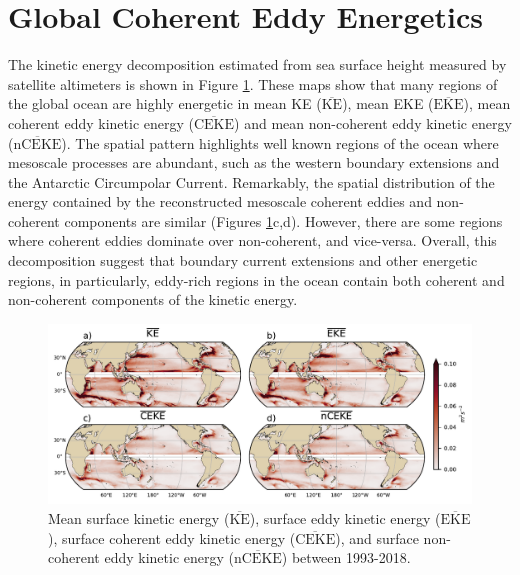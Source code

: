 \documentclass[draft,linenumbers]{agujournal2019}
\newcommand{\MKE}{\overline{\textrm{KE}}}
\newcommand{\MEKE}{\overline{\textrm{EKE}}}
\newcommand{\MCEKE}{\overline{\textrm{CEKE}}}
\newcommand{\MnCEKE}{\overline{\textrm{nCEKE}}}
\begin{document}
	\section{Global Coherent Eddy Energetics}
	\label{sec:CEKE_climatology}


	The kinetic energy decomposition estimated from sea surface height measured by satellite altimeters is shown in Figure \ref{fig:eddy_climatology}. 
	These maps show that many regions of the global ocean are highly energetic in mean KE ($\MKE$), mean EKE ($\MEKE$), mean coherent eddy kinetic energy ($\MCEKE$) and mean non-coherent eddy kinetic energy ($\MnCEKE$). 
	The spatial pattern highlights well known regions of the ocean where mesoscale processes are abundant, such as the western boundary extensions and the Antarctic Circumpolar Current. 
	Remarkably, the spatial distribution of the energy contained by the reconstructed mesoscale coherent eddies and non-coherent components are similar (Figures \ref{fig:eddy_climatology}c,d). 
	However, there are some regions where coherent eddies dominate over non-coherent, and vice-versa. 
	Overall, this decomposition suggest that boundary current extensions and other energetic regions, in particularly, eddy-rich regions in the ocean contain both coherent and non-coherent components of the kinetic energy.

	\begin{figure}[t]
	    \centering
	    \includegraphics[width=1\textwidth]{figures/mean_ke_maps_satellite.pdf}
	    \caption{Mean surface kinetic energy ($\MKE$), surface eddy kinetic energy ($\MEKE$), surface coherent eddy kinetic energy ($\MCEKE$), and surface non-coherent eddy kinetic energy ($\MnCEKE$) between 1993-2018.}
	    \label{fig:eddy_climatology}
	\end{figure}
\end{document}
